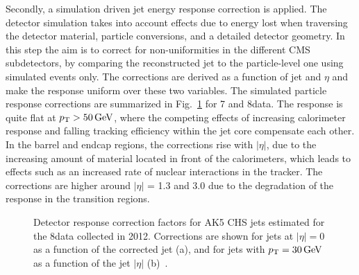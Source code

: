 Secondly, a simulation driven jet energy response correction is applied. The detector simulation takes into account effects due to
energy lost when traversing the detector material, particle conversions, and a detailed detector geometry. In this step the aim is to correct for non-uniformities in the different CMS subdetectors, by comparing the reconstructed jet \pt to the particle-level one using simulated events only. The corrections are derived as a function of jet \pt and $\eta$ and make the response uniform over these two variables. The simulated particle response corrections are summarized in Fig.~\ref{fig:MCcorr_ak5chs} for 7 and 8\TeV data. The response is quite flat at $p_{\mathrm{T}} > 50\,\text{Ge\hspace{-.08em}V}$, where the competing effects of increasing calorimeter response and falling tracking efficiency within the jet core compensate each other. In the barrel and endcap regions, the corrections rise with $|\eta|$, due to the increasing amount of material located in front of the calorimeters, which leads to effects such as an increased rate of nuclear interactions in the tracker. The corrections are higher around $|\eta|$ = 1.3 and 3.0 due to the degradation of the response in the transition regions.

\begin{figure}[!htb]
\centering
{}
\caption{Detector response correction factors for AK5 CHS jets estimated for the 8\TeV data collected in 2012. Corrections are shown for jets at $|\eta| = 0$ as a function of the corrected jet \pt (a), and for jets with $p_{\mathrm{T}} = 30\,\text{Ge\hspace{-.08em}V}$ as a function of the jet $|\eta|$ (b)~\cite{Khachatryan:2016kdb}.}
\label{fig:MCcorr_ak5chs}
\end{figure}

